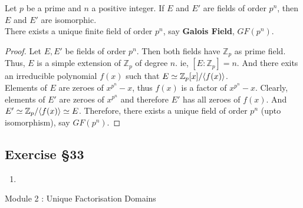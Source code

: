 \begin{theorem}
	Let $p$ be a prime and $n$ a positive integer.
	If $E$ and $E'$ are fields of order $p^n$, then $E$ and $E'$ are isomorphic.\\

	There exists a unique finite field of order $p^n$, say \textbf{Galois Field}, $GF(p^n)$.
\end{theorem}
\begin{proof}
	Let $E,E'$ be fields of order $p^n$.
	Then both fields have $\mathbb{Z}_p$ as prime field.
	Thus, $E$ is a simple extension of $\mathbb{Z}_p$ of degree $n$.
	ie, $[E:\mathbb{Z}_p] = n$.
	And there exits an irreducible polynomial $f(x)$ such that $E \simeq \mathbb{Z}_p[x]/\langle f(x)\rangle$. \\


	Elements of $E$ are zeroes of $x^{p^n}-x$, thus $f(x)$ is a factor of $x^{p^n}-x$.
	Clearly, elements of $E'$ are zeroes of $x^{p^n}$ and therefore $E'$ has all zeroes of $f(x)$.
	And $E' \simeq \mathbb{Z}_p/\langle f(x)\rangle\simeq E$.
	Therefore, there exists a unique field of order $p^n$ (upto isomorphism), say $GF(p^n)$.
\end{proof}

\subsection{Exercise \S33}
\begin{enumerate}
	\item
\end{enumerate}

\pagebreak
{\Large Module  2 : Unique Factorisation Domains}
